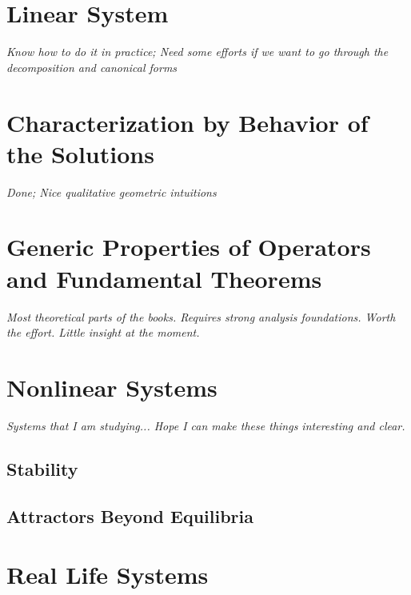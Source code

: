 \documentclass[12pt,oneside]{book}
\begin{document}
	\section{Linear System}
	
    \textit{Know how to do it in practice; Need some efforts if we want to go through the decomposition and canonical forms}
    
    \section{Characterization by Behavior of the Solutions}
    
    \textit{Done; Nice qualitative geometric intuitions}
    
    \section{Generic Properties of Operators and Fundamental Theorems}
    
    
    \textit{Most theoretical parts of the books. Requires strong analysis foundations. Worth the effort. Little insight at the moment.}
    
    \section{Nonlinear Systems}
    
    \textit{Systems that I am studying... Hope I can make these things interesting and clear.}
    
    \subsection{Stability}
    \subsection{Attractors Beyond Equilibria}
    
    \section{Real Life Systems}
    
\end{document}
